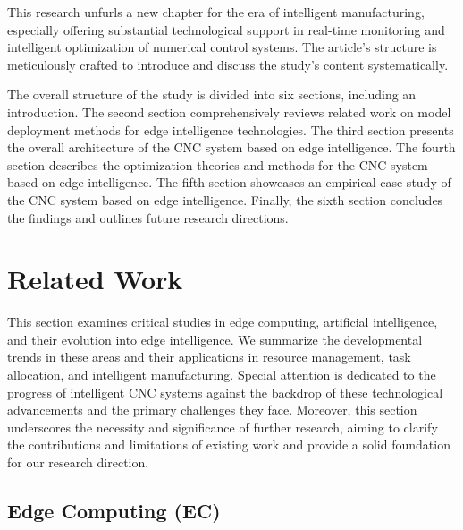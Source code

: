 \documentclass[preprint,12pt]{elsarticle}
\begin{document}
This research unfurls a new chapter for the era of intelligent manufacturing, especially offering substantial technological support in real-time monitoring and intelligent optimization of numerical control systems. The article's structure is meticulously crafted to introduce and discuss the study's content systematically.

The overall structure of the study is divided into six sections, including an introduction. The second section comprehensively reviews related work on model deployment methods for edge intelligence technologies. The third section presents the overall architecture of the CNC system based on edge intelligence. The fourth section describes the optimization theories and methods for the CNC system based on edge intelligence. The fifth section showcases an empirical case study of the CNC system based on edge intelligence. Finally, the sixth section concludes the findings and outlines future research directions.

\section{Related Work}

This section examines critical studies in edge computing, artificial intelligence, and their evolution into edge intelligence. We summarize the developmental trends in these areas and their applications in resource management, task allocation, and intelligent manufacturing.  Special attention is dedicated to the progress of intelligent CNC systems against the backdrop of these technological advancements and the primary challenges they face.  Moreover, this section underscores the necessity and significance of further research, aiming to clarify the contributions and limitations of existing work and provide a solid foundation for our research direction.

\subsection{Edge Computing (EC)}
\end{document}
